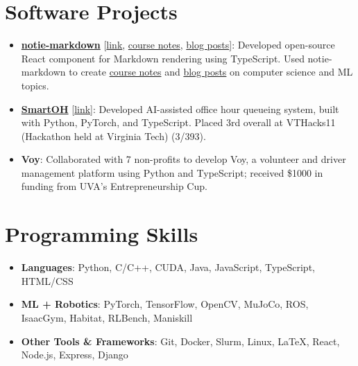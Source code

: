 \documentclass[letterpaper,11pt]{article}
\newcommand{\linkhref}[2]{\textcolor{linkblue}{\href{#1}{#2}}}
\begin{document}
\section{Software Projects}
\begin{itemize}[label={}, leftmargin=0pt]
  \item \textbf{\href{https://notie-markdown.vercel.app/}{notie-markdown}} [\linkhref{https://notie-markdown.vercel.app/}{link}, \linkhref{https://www.brandonyifanyang.com/notes}{course notes}, \linkhref{https://www.brandonyifanyang.com/blog}{blog posts}]: Developed open-source React component for Markdown rendering using TypeScript. Used notie-markdown to create \href{https://www.brandonyifanyang.com/notes}{course notes} and \href{https://www.brandonyifanyang.com/blog}{blog posts} on computer science and ML topics.
  \item \textbf{\href{https://github.com/ewei2406/SmartOH}{SmartOH}} [\linkhref{https://github.com/ewei2406/SmartOH}{link}]: Developed AI-assisted office hour queueing system, built with Python, PyTorch, and TypeScript. Placed 3rd overall at VTHacks11 (Hackathon held at Virginia Tech) (3/393).
  \item \textbf{Voy}: Collaborated with 7 non-profits to develop Voy, a volunteer and driver management platform using Python and TypeScript; received \$1000 in funding from UVA's Entrepreneurship Cup.
\end{itemize}

\section{Programming Skills}
\begin{itemize}[label={}, leftmargin=0pt]
  \item \textbf{Languages}: Python, C/C++, CUDA, Java, JavaScript, TypeScript, HTML/CSS
  \item \textbf{ML + Robotics}: PyTorch, TensorFlow, OpenCV, MuJoCo, ROS, IsaacGym, Habitat, RLBench, Maniskill
  \item \textbf{Other Tools \& Frameworks}: Git, Docker, Slurm, Linux, \LaTeX, React, Node.js, Express, Django
\end{itemize}
\end{document}
